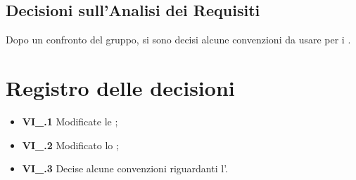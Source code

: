 \subsection{Decisioni sull'Analisi dei Requisiti}
Dopo un confronto del gruppo, si sono decisi alcune convenzioni da usare per i .

\section{Registro delle decisioni}
\begin{itemize}
  \item \textbf{VI\_\Data.1} Modificate le \NdP;
  \item \textbf{VI\_\Data.2} Modificato lo \SdF;
  \item \textbf{VI\_\Data.3} Decise alcune convenzioni riguardanti l'\AdR.
\end{itemize}